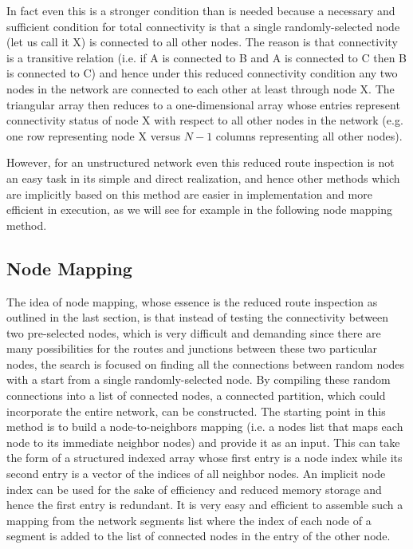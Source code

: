 \documentclass[a4paper,12pt]{article}
\begin{document}
In fact even this is a stronger condition than is needed because a necessary and sufficient
condition for total connectivity is that a single randomly-selected node (let us call it X) is
connected to all other nodes. The reason is that connectivity is a transitive relation (i.e. if A
is connected to B and A is connected to C then B is connected to C) and hence under this reduced
connectivity condition any two nodes in the network are connected to each other at least through
node X. The triangular array then reduces to a one-dimensional array whose entries represent
connectivity status of node X with respect to all other nodes in the network (e.g. one row
representing node X versus $N-1$ columns representing all other nodes).

However, for an unstructured network even this reduced route inspection is not an easy task in its
simple and direct realization, and hence other methods which are implicitly based on this method
are easier in implementation and more efficient in execution, as we will see for example in the
following node mapping method.

\subsection{Node Mapping}

The idea of node mapping, whose essence is the reduced route inspection as outlined in the last
section, is that instead of testing the connectivity between two pre-selected nodes, which is very
difficult and demanding since there are many possibilities for the routes and junctions between
these two particular nodes, the search is focused on finding all the connections between random
nodes with a start from a single randomly-selected node. By compiling these random connections into
a list of connected nodes, a connected partition, which could incorporate the entire network, can
be constructed. The starting point in this method is to build a node-to-neighbors mapping (i.e. a
nodes list that maps each node to its immediate neighbor nodes) and provide it as an input. This
can take the form of a structured indexed array whose first entry is a node index while its second
entry is a vector of the indices of all neighbor nodes. An implicit node index can be used for the
sake of efficiency and reduced memory storage and hence the first entry is redundant. It is very
easy and efficient to assemble such a mapping from the network segments list where the index of
each node of a segment is added to the list of connected nodes in the entry of the other node.
\end{document}
